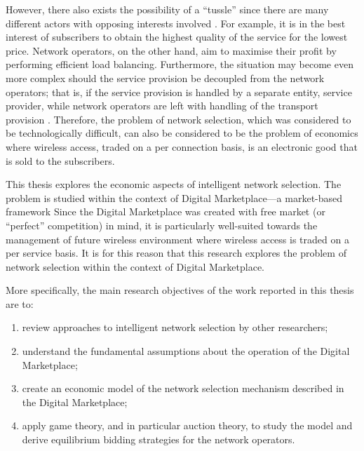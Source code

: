 However, there also exists the possibility of a ``tussle'' since there are many different actors with opposing interests involved \cite{Clark02}. For example, it is in the best interest of subscribers to obtain the highest quality of the service for the lowest price. Network operators, on the other hand, aim to maximise their profit by performing efficient load balancing. Furthermore, the situation may become even more complex should the service provision be decoupled from the network operators; that is, if the service provision is handled by a separate entity, service provider, while network operators are left with handling of the transport provision \cite{DMBushTussle09}. Therefore, the problem of network selection, which was considered to be technologically difficult, can also be considered to be the problem of economics where wireless access, traded on a per connection basis, is an electronic good that is sold to the subscribers.

This thesis explores the economic aspects of intelligent network selection. The problem is studied within the context of Digital Marketplace---a  market-based framework  Since the Digital Marketplace was created with free market (or ``perfect'' competition) in mind, it is particularly well-suited towards the management of future wireless environment where wireless access is traded on a per service basis. It is for this reason that this research explores the problem of network selection within the context of Digital Marketplace.

More specifically, the main research objectives of the work reported in this thesis are to:
\begin{enumerate}
\item review approaches to intelligent network selection by other researchers;
\item understand the fundamental assumptions about the operation of the Digital Marketplace;
\item create an economic model of the network selection mechanism described in the Digital Marketplace;
\item apply game theory, and in particular auction theory, to study the model and derive equilibrium bidding strategies for the network operators.
\end{enumerate}

